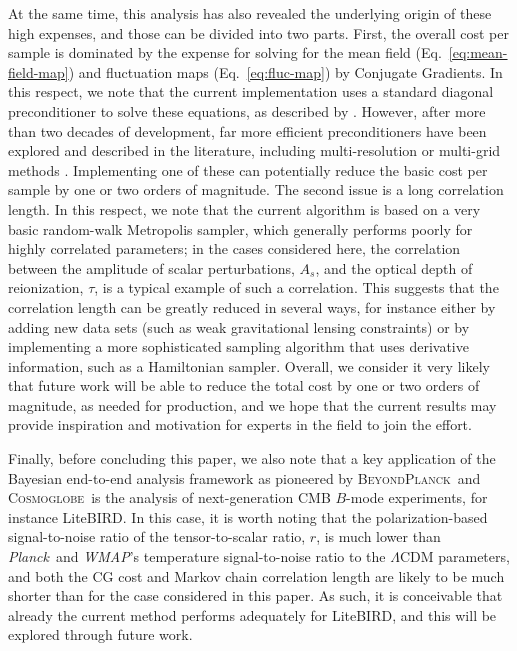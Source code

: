 \documentclass[twocolumn]{aa}
\def\WMAP{\emph{WMAP}}
\def\Planck{\emph{Planck}}
\newcommand{\BP}{\textsc{BeyondPlanck}}
\newcommand{\cosmoglobe}{\textsc{Cosmoglobe}}
\begin{document}
At the same time, this analysis has also revealed the underlying origin of these high expenses, and those can be divided into two parts. First, the overall cost per sample is dominated by the expense for solving for the mean field (Eq.~\eqref{eq:mean-field-map}) and fluctuation maps (Eq.~\eqref{eq:fluc-map}) by Conjugate Gradients. In this respect, we note that the current implementation uses a standard diagonal preconditioner to solve these equations, as described by \citet{eriksen:2004}. However, after more than two decades of development, far more efficient preconditioners have been explored and described in the literature, including multi-resolution or multi-grid methods \citep[e.g.,][]{seljebotn:2013,seljebotn:2019}. Implementing one of these can potentially reduce the basic cost per sample by one or two orders of magnitude. The second issue is a long correlation length. In this respect, we note that the current algorithm is based on a very basic random-walk Metropolis sampler, which generally performs poorly for highly correlated parameters; in the cases considered here, the correlation between the amplitude of scalar perturbations, $A_s$, and the optical depth of reionization, $\tau$, is a typical example of such a correlation. This suggests that the correlation length can be greatly reduced in several ways, for instance either by adding new data sets (such as weak gravitational lensing constraints) or by implementing a more sophisticated sampling algorithm that uses derivative information, such as a Hamiltonian sampler. Overall, we consider it very likely that future work will be able to reduce the total cost by one or two orders of magnitude, as needed for production, and we hope that the current results may provide inspiration and motivation for experts in the field to join the effort.

Finally, before concluding this paper, we also note that a key application of the Bayesian end-to-end analysis framework as pioneered by \BP\ and \cosmoglobe\ is the analysis of next-generation CMB $B$-mode experiments, for instance LiteBIRD. In this case, it is worth noting that the polarization-based signal-to-noise ratio of the tensor-to-scalar ratio, $r$, is much lower than \Planck\ and \WMAP's temperature signal-to-noise ratio to the $\Lambda$CDM parameters, and both the CG cost and Markov chain correlation length are likely to be much shorter than for the case considered in this paper. As such, it is conceivable that already the current method performs adequately for LiteBIRD, and this will be explored through future work.
\end{document}
